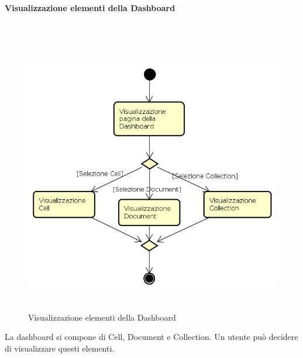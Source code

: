 \paragraph{Visualizzazione elementi della Dashboard} \mbox{} \\
\begin{figure}[H]
\begin{center}
\includegraphics[height=12cm]{res/sections/backend/activities/visualizzazioneElementDashboard.png}
\caption{Visualizzazione elementi della Dashboard}
\end{center}
\end{figure}
\newpage
La dashboard si compone di Cell, Document e Collection. Un utente può decidere di visualizzare questi elementi.

